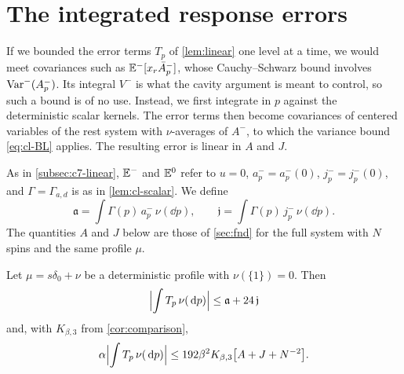 \section{The integrated response errors}\label{sec:c7-response}

If we bounded the error terms $T_p$ of \cref{lem:linear} one level
at a time, we would meet covariances such as $\mathbb E^-[x_r\bar A_p^-]$,
whose Cauchy--Schwarz bound involves $\operatorname{Var}^-(A_p^-)$. Its integral
$V^-$ is what the cavity argument is meant to control, so such a bound
is of no use. Instead, we first integrate in $p$ against the
deterministic scalar kernels. The error terms then become covariances
of centered variables of the rest system with $\nu$-averages of $A^-$,
to which the variance bound \eqref{eq:cl-BL} applies. The resulting
error is linear in $A$ and $J$.

As in \cref{subsec:c7-linear}, $\mathbb E^-$ and $\mathbb E^0$ refer to $u=0$,
$a_p^-=a_p^-(0)$, $j_p^-=j_p^-(0)$, and $\Gamma=\Gamma_{a,d}$ is as in
\cref{lem:cl-scalar}. We define
\[
 \mathfrak a=\int\Gamma(p)\,a_p^-\,\nu(\dd p),\qquad
 \mathfrak j=\int\Gamma(p)\,j_p^-\,\nu(\dd p).
\]
The quantities $A$ and $J$ below are those of \cref{sec:fnd} for the
full system with $N$ spins and the same profile $\mu$.

\begin{lemma}\label{lem:cl-response}
Let $\mu=s\delta_0+\nu$ be a deterministic profile with
$\nu(\{1\})=0$. Then
\begin{equation}\label{eq:cl-response}
 \Bigl|\int T_p\,\nu(\,\mathrm d p)\Bigr|\le\mathfrak a+24\,\mathfrak j
\end{equation}
and, with $K_{\beta,3}$ from \cref{cor:comparison},
\begin{equation}\label{eq:cl-response-final}
 \alpha\Bigl|\int T_p\,\nu(\,\mathrm d p)\Bigr|
 \le192\beta^2K_{\beta,3}\bigl[A+J+N^{-2}\bigr].
\end{equation}
\end{lemma}


